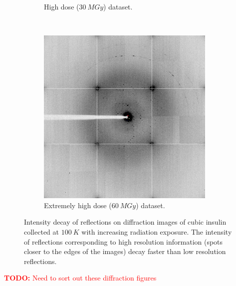 \begin{figure}
\begin{subfigure}[b]{0.45\textwidth}
                    \caption{High dose ($30\ MGy$) dataset.}
                    \label{fig:Intensity decay insulin diffraction image 30MGy}
            \end{subfigure}
            \\
            \begin{subfigure}[b]{0.45\textwidth}
                    \centering
                    \includegraphics[width=\textwidth]{figures/introduction/intensityloss_60MGy.png}
                    \caption{Extremely high dose ($60\ MGy$) dataset.}
                    \label{fig:Intensity decay insulin diffraction image 60MGy}
            \end{subfigure}
            \caption{Intensity decay of reflections on diffraction images of cubic insulin collected at $100\ K$ with increasing radiation exposure. The intensity of reflections corresponding to high resolution information (spots closer to the edges of the images) decay faster than low resolution reflections.}
            \label{fig:Intensity decay insulin diffraction images}
        \end{figure}
        \textcolor{red}{
            \begin{myenumerate}
                \item \hypertarget{todo:sort diffraction figures}{\textbf{TODO:} Need to sort out these diffraction figures}
            \end{myenumerate}
        }

